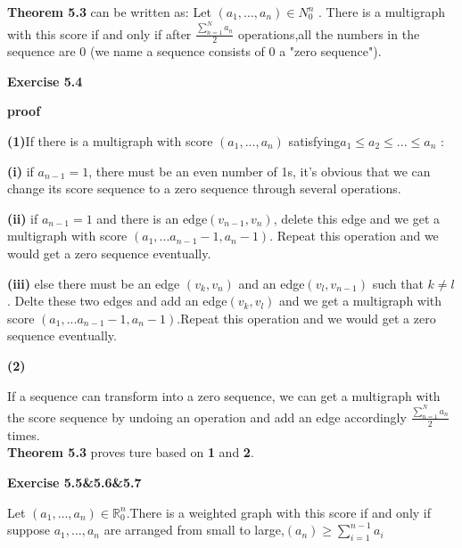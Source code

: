 \documentclass{article} %
\begin{document}
	\textbf{Theorem 5.3} can be written as: Let $(a_1,...,a_n) \in N^{n}_0$ . There is a multigraph with this score if and only if after $\frac{\sum_{n=1}^Na_n}{2}$ operations,all the numbers in the sequence are 0 (we name a sequence consists of 0 a "zero sequence").\par

	\textbf{Exercise 5.4}\par
	\textbf{proof}\par 
	 \textbf{(1)}If there is a multigraph with score $(a_1,...,a_n)$ satisfying$a_1\leq a_2\leq ...\leq a_n$ :\par
	  \textbf{(i)} if $a_{n-1}=1$, there must be an even number of 1s, it's obvious that we can change its score sequence to a zero sequence through several operations.\par
	  \textbf{(ii)} if $a_{n-1}=1$ and there is an edge$(v_{n-1},v_n)$, delete this edge and we get a multigraph with score $(a_1,...a_{n-1}-1,a_n-1)$. Repeat this operation and we would get a zero sequence eventually.\par
	  \textbf{(iii)} else there must be an edge $(v_k,v_n)$ and an edge$(v_l,v_{n-1})$ such that $k\not=l$. Delte these two edges and add an edge$(v_k,v_l)$ and we get a multigraph with score $(a_1,...a_{n-1}-1,a_n-1)$.Repeat this operation and we would get a zero sequence eventually.\par
	  \textbf{(2)}\par
	  If a sequence can transform into a zero sequence, we can get a multigraph with the score sequence by undoing an operation and add an edge accordingly $\frac{\sum_{n=1}^Na_n}{2}$ times.\\
	  \textbf{Theorem 5.3} proves ture based on \textbf{1} and \textbf{2}.


\textbf{Exercise 5.5\&5.6\&5.7}\par
      
        Let $(a_1,\dots,a_n) \in \mathbb{R}_0^n$.There is a weighted graph with this score if and only if
        suppose $a_1,\dots,a_n$ are arranged from small to large,$(a_n)$$\ge$$\sum_{i=1}^{n-1}a_i$
      
\end{document}
